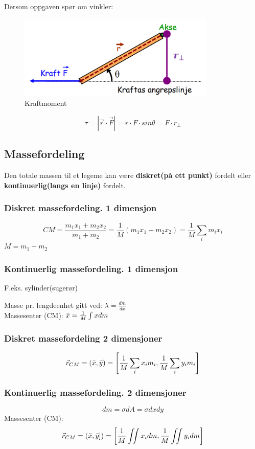 \documentclass[12pt]{article}
\begin{document}
Dersom oppgaven spør om vinkler:
\begin{figure} [H]
    \centering
    \includegraphics[height = 4cm]{images/torque.png}
    \caption{Kraftmoment}
\end{figure}
$$\tau = |\Vec{r}\cdot \Vec{F}| = r\cdot F \cdot sin\theta = F\cdot r_{\perp}$$

\subsection{Massefordeling}
Den totale massen til et legeme kan være \textbf{diskret(på ett punkt)} fordelt eller \textbf{kontinuerlig(langs en linje)} fordelt. 

\subsubsection{Diskret massefordeling. 1 dimensjon}
$$CM = \frac{m_1x_1+m_2x_2}{m_1+m_2} = \frac{1}{M}(m_1x_1+m_2x_2) = \frac{1}{M}\sum_i{m_ix_i}$$
$M = m_1+m_2$

\subsubsection{Kontinuerlig massefordeling. 1 dimensjon}
F.eks. sylinder(sugerør)

Masse pr. lengdeenhet gitt ved: $\lambda = \frac{dm}{dx}$\\
Massesenter (CM): $\Bar{x} = \frac{1}{M} \int x dm$

\subsubsection{Diskret massefordeling 2 dimensjoner}
$$\Vec{r}_{CM} = (\Bar{x}, \Bar{y}) = \left[ \frac{1}{M} \sum_i x_im_i, \frac{1}{M} \sum_i y_i m_i \right]$$

\subsubsection{Kontinuerlig massefordeling. 2 dimensjoner}
$$dm = \sigma dA = \sigma dxdy$$
Massesenter (CM):
$$\Vec{r}_{CM} = (\Bar{x}, \Bar{y}])= \left[\frac{1}{M} \iint x_i dm, \frac{1}{M} \iint y_idm\right]$$
\end{document}
